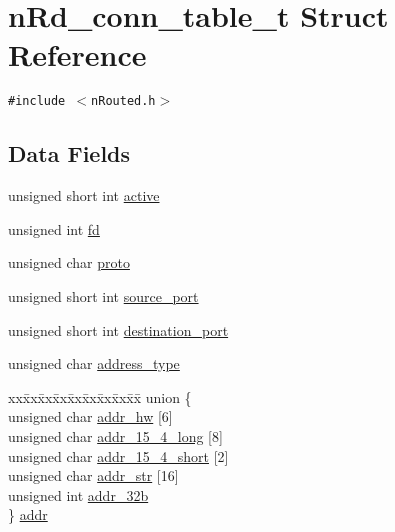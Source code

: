 \hypertarget{structnRd__conn__table__t}{
\section{n\-Rd\_\-conn\_\-table\_\-t Struct Reference}
\label{structnRd__conn__table__t}
}
{\tt \#include $<$n\-Routed.h$>$}

\subsection*{Data Fields}
\begin{CompactItemize}
\item 
unsigned short int \hyperlink{structnRd__conn__table__t_ef29a3bed84c79f36abb200754e0d8f9}{active}
\item 
unsigned int \hyperlink{structnRd__conn__table__t_a5c0f98d682b0b0c72b3d4d62b086f05}{fd}
\item 
unsigned char \hyperlink{structnRd__conn__table__t_6c975baed728a05b1bd47c7c13f2d50e}{proto}
\item 
unsigned short int \hyperlink{structnRd__conn__table__t_f096eab8cfea2f2bb18763a05114c3f5}{source\_\-port}
\item 
unsigned short int \hyperlink{structnRd__conn__table__t_c53b007ada85589b07305a287e3173cd}{destination\_\-port}
\item 
unsigned char \hyperlink{structnRd__conn__table__t_f6751f67d1c85517fe6f930da3479fec}{address\_\-type}
\item 
\begin{tabbing}
xx\=xx\=xx\=xx\=xx\=xx\=xx\=xx\=xx\=\kill
union \{\\
\>unsigned char \hyperlink{structnRd__conn__table__t_ff09c033c2910e672f3f89c6110a8695}{addr\_hw} \mbox{[}6\mbox{]}\\
\>unsigned char \hyperlink{structnRd__conn__table__t_6c297e055b95f2789f00e341e5aef58e}{addr\_15\_4\_long} \mbox{[}8\mbox{]}\\
\>unsigned char \hyperlink{structnRd__conn__table__t_b92003a2d27148c501eee1a5d3e1f1a1}{addr\_15\_4\_short} \mbox{[}2\mbox{]}\\
\>unsigned char \hyperlink{structnRd__conn__table__t_581a82e1027a1ab6f1c4f81afdc5168b}{addr\_str} \mbox{[}16\mbox{]}\\
\>unsigned int \hyperlink{structnRd__conn__table__t_ca2bf21d951dd2a9a5f7ae3cfe76c663}{addr\_32b}\\
\} \hyperlink{structnRd__conn__table__t_d7e8f221fee270280ec02008d48aec4d}{addr}\\

\end{tabbing}\end{CompactItemize}


